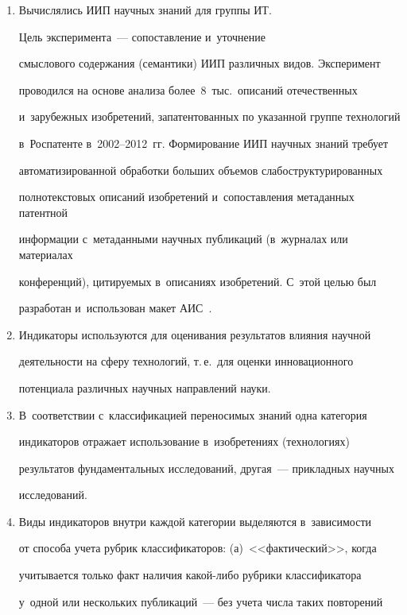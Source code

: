      \begin{enumerate}[1.]


\item Вычислялись ИИП научных знаний для группы ИТ. 


Цель эксперимента~--- сопоставление и~уточнение 


смыслового содержания (семантики) ИИП различных видов. Эксперимент 


проводился на основе анализа более~8~тыс.\ описаний отечественных 


и~зарубежных изобретений, запатентованных по указанной группе технологий 


в~Роспатенте в~2002--2012~гг. Формирование ИИП научных знаний требует 


автоматизированной обработки больших объемов слабоструктурированных 


полнотекстовых описаний изобретений и~сопоставления метаданных патентной 


информации с~метаданными научных публикаций (в~журналах или материалах 


конференций), цитируемых в~описаниях изобретений. С~этой целью был 


разработан и~использован макет АИС~\cite{1-mins, 3-mins}. 


\item Индикаторы используются для оценивания результатов влияния научной 


деятельности на сферу технологий, т.\,е.\ для оценки инновационного 


потенциала различных научных направлений науки.


\item В~соответствии с~классификацией переносимых знаний одна категория 


индикаторов отражает использование в~изобретениях (технологиях) 


результатов фундаментальных исследований, другая~--- прикладных научных 


исследований.


\item Виды индикаторов внутри каждой категории выделяются в~зависимости 


от способа учета рубрик классификаторов: (а)~<<фактический>>, когда 


учитывается только факт наличия ка\-кой-ли\-бо рубрики классификатора 


у~одной или нескольких публикаций~--- без учета числа таких повторений 



\end{enumerate}

